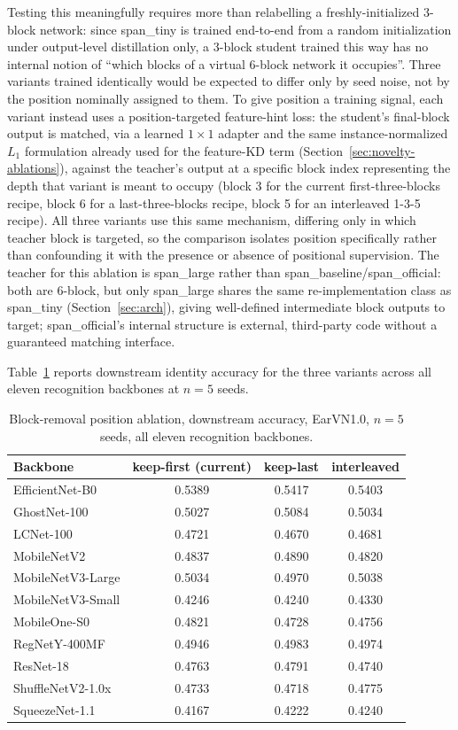 \documentclass[11pt]{article}
\begin{document}
Testing this meaningfully requires more than relabelling a freshly-initialized 3-block network: since span\_tiny is trained end-to-end from a random initialization under output-level distillation only, a 3-block student trained this way has no internal notion of ``which blocks of a virtual 6-block network it occupies''. Three variants trained identically would be expected to differ only by seed noise, not by the position nominally assigned to them. To give position a training signal, each variant instead uses a position-targeted feature-hint loss: the student's final-block output is matched, via a learned $1\times1$ adapter and the same instance-normalized $L_1$ formulation already used for the feature-KD term (Section~\ref{sec:novelty-ablations}), against the teacher's output at a specific block index representing the depth that variant is meant to occupy (block 3 for the current first-three-blocks recipe, block 6 for a last-three-blocks recipe, block 5 for an interleaved 1-3-5 recipe). All three variants use this same mechanism, differing only in which teacher block is targeted, so the comparison isolates position specifically rather than confounding it with the presence or absence of positional supervision. The teacher for this ablation is span\_large rather than span\_baseline/span\_official: both are 6-block, but only span\_large shares the same re-implementation class as span\_tiny (Section~\ref{sec:arch}), giving well-defined intermediate block outputs to target; span\_official's internal structure is external, third-party code without a guaranteed matching interface.

Table~\ref{tab:position-ablation} reports downstream identity accuracy for the three variants across all eleven recognition backbones at $n=5$ seeds.

\begin{table}[H]
\centering
\caption{Block-removal position ablation, downstream accuracy, EarVN1.0, $n=5$ seeds, all eleven recognition backbones.}
\label{tab:position-ablation}
\begin{tabular}{lccc}
\toprule
Backbone & keep-first (current) & keep-last & interleaved \\
\midrule
EfficientNet-B0     & 0.5389 & 0.5417 & 0.5403 \\
GhostNet-100        & 0.5027 & 0.5084 & 0.5034 \\
LCNet-100           & 0.4721 & 0.4670 & 0.4681 \\
MobileNetV2         & 0.4837 & 0.4890 & 0.4820 \\
MobileNetV3-Large   & 0.5034 & 0.4970 & 0.5038 \\
MobileNetV3-Small   & 0.4246 & 0.4240 & 0.4330 \\
MobileOne-S0        & 0.4821 & 0.4728 & 0.4756 \\
RegNetY-400MF       & 0.4946 & 0.4983 & 0.4974 \\
ResNet-18           & 0.4763 & 0.4791 & 0.4740 \\
ShuffleNetV2-1.0x   & 0.4733 & 0.4718 & 0.4775 \\
SqueezeNet-1.1      & 0.4167 & 0.4222 & 0.4240 \\
\bottomrule
\end{tabular}
\end{table}
\end{document}
